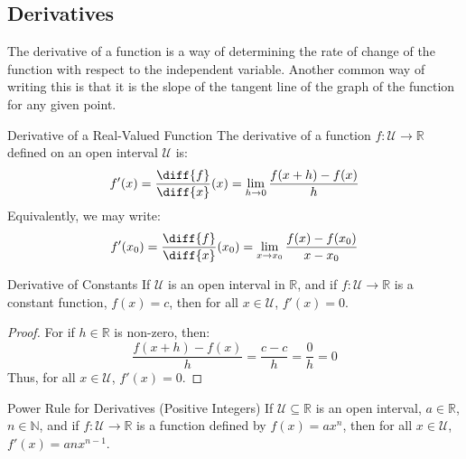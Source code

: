 \documentclass[crop=false,class=book,oneside]{standalone}
\begin{document}
    \subsection{Derivatives}
        The derivative of a function is a way of determining
        the rate of change of the function with respect to
        the independent variable. Another common way of
        writing this is that it is the slope of the tangent
        line of the graph of the function for any given
        point.
        \begin{ldefinition}{Derivative of a Real-Valued Function}
            The derivative of a function
            $f:\mathcal{U}\rightarrow\mathbb{R}$
            defined on an open interval $\mathcal{U}$ is:
            \begin{equation}
                f'(x)
                =\frac{\diff{f}}{\diff{x}}(x)
                =\lim_{h\rightarrow{0}}\frac{f(x+h)-f(x)}{h}
            \end{equation}
            Equivalently, we may write:
            \begin{equation*}
                f'(x_{0})
                =\frac{\diff{f}}{\diff{x}}(x_{0})
                =\lim_{x\rightarrow{x_{0}}}
                \frac{f(x)-f(x_{0})}{x-x_{0}}
            \end{equation*}
        \end{ldefinition}
        \begin{ltheorem}{Derivative of Constants}
            If $\mathcal{U}$ is an open interval in
            $\mathbb{R}$, and if
            $f:\mathcal{U}\rightarrow\mathbb{R}$ is
            a constant function, $f(x)=c$, then
            for all $x\in\mathcal{U}$,
            $f'(x)=0$.
        \end{ltheorem}
        \begin{proof}
            For if $h\in\mathbb{R}$ is non-zero, then:
            \begin{equation}
                \frac{f(x+h)-f(x)}{h}
                =\frac{c-c}{h}
                =\frac{0}{h}
                =0
            \end{equation}
            Thus, for all $x\in\mathcal{U}$, $f'(x)=0$.
        \end{proof}
        \begin{ltheorem}{Power Rule for Derivatives (Positive Integers)}
            If $\mathcal{U}\subseteq\mathbb{R}$ is an open
            interval, $a\in\mathbb{R}$, $n\in\mathbb{N}$,
            and if $f:\mathcal{U}\rightarrow\mathbb{R}$
            is a function defined by $f(x)=ax^{n}$, then
            for all $x\in\mathcal{U}$, $f'(x)=anx^{n-1}$.
        \end{ltheorem}
\end{document}
